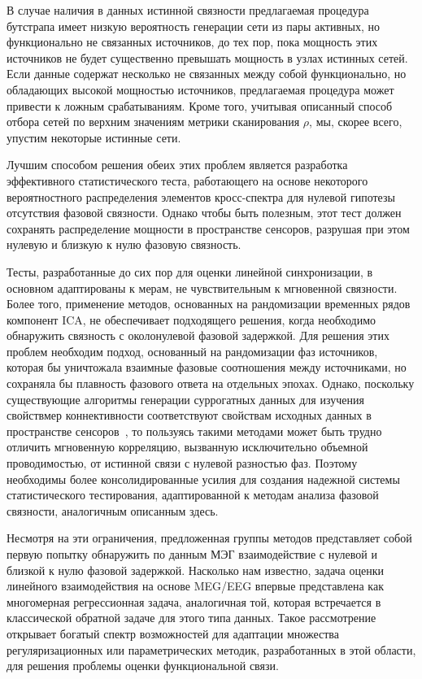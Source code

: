 В случае наличия в данных истинной связности предлагаемая процедура бутстрапа
имеет низкую вероятность генерации сети из пары активных, но функционально
не связанных источников, до тех пор, пока мощность этих источников
не будет существенно превышать мощность в узлах истинных сетей.
Если данные содержат несколько не связанных между собой функционально, но
обладающих высокой мощностью
источников, предлагаемая процедура может привести к ложным срабатываниям. Кроме
того, учитывая описанный способ отбора сетей по верхним значениям метрики
сканирования $\rho$, мы, скорее всего, упустим некоторые истинные сети.

Лучшим способом решения обеих этих проблем является разработка эффективного
статистического теста, работающего на основе некоторого вероятностного
распределения элементов кросс-спектра  для нулевой гипотезы отсутствия фазовой
связности. Однако чтобы быть полезным, этот тест должен сохранять
распределение мощности в пространстве сенсоров, разрушая при этом нулевую и
близкую к нулю фазовую связность.

Тесты, разработанные до сих пор для оценки линейной синхронизации, в основном
адаптированы к мерам, не чувствительным к мгновенной связности. Более того,
применение методов, основанных на рандомизации временных рядов компонент ICA,
не обеспечивает подходящего решения, когда необходимо обнаружить связность с
околонулевой фазовой задержкой. Для решения этих проблем необходим подход,
основанный на рандомизации фаз источников, которая бы уничтожала взаимные
фазовые соотношения между источниками, но сохраняла бы плавность фазового
ответа на отдельных эпохах.  Однако, поскольку существующие алгоритмы генерации
суррогатных данных для изучения свойствмер коннективности соответствуют
свойствам исходных данных в пространстве сенсоров~\cite{Haufe_Evald_2016}, то
пользуясь такими методами может быть трудно отличить мгновенную корреляцию,
вызванную исключительно объемной проводимостью, от истинной связи с нулевой
разностью фаз. Поэтому необходимы более консолидированные усилия для создания
надежной системы статистического тестирования, адаптированной к методам анализа
фазовой связности, аналогичным описанным здесь.

Несмотря на эти ограничения, предложенная группы методов
представляет собой первую попытку обнаружить по данным МЭГ взаимодействие
с нулевой и близкой к нулю фазовой задержкой.
Насколько нам известно, задача оценки линейного взаимодействия на
основе MEG/EEG впервые представлена как многомерная регрессионная задача,
аналогичная той, которая встречается в классической обратной задаче для этого
типа данных. Такое рассмотрение открывает богатый спектр возможностей для
адаптации множества регуляризационных или параметрических методик,
разработанных в этой области, для решения проблемы оценки функциональной связи.

